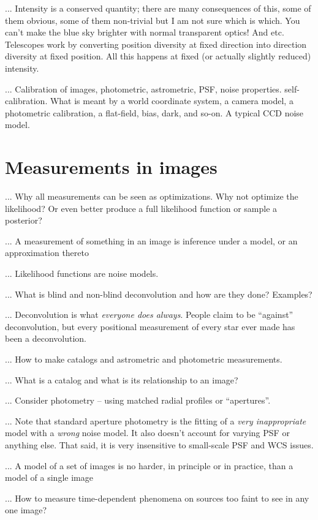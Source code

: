 \documentclass[12pt,twoside,pdftex]{article}
\begin{document}
... Intensity is a conserved quantity; there are many consequences of
this, some of them obvious, some of them non-trivial but I am not sure
which is which.  You can't make the blue sky brighter with normal
transparent optics!  And etc.  Telescopes work by converting position
diversity at fixed direction into direction diversity at fixed
position.  All this happens at fixed (or actually slightly reduced)
intensity.

... Calibration of images, photometric, astrometric, PSF, noise
properties.  self-calibration.  What is meant by a world coordinate
system, a camera model, a photometric calibration, a flat-field, bias,
dark, and so-on.  A typical CCD noise model.

\section{Measurements in images}

... Why all measurements can be seen as optimizations.  Why not
optimize the likelihood?  Or even better produce a full likelihood
function or sample a posterior?

... A measurement of something in an image is inference under a model,
or an approximation thereto

... Likelihood functions are noise models.

... What is blind and non-blind deconvolution and how are they done?
Examples?
 
... Deconvolution is what \emph{everyone does always}.  People claim
to be ``against'' deconvolution, but every positional measurement of
every star ever made has been a deconvolution.

... How to make catalogs and astrometric and photometric measurements.

... What is a catalog and what is its relationship to an image?

... Consider photometry -- using matched radial profiles or
``apertures''.

... Note that standard aperture photometry is the fitting of a
\emph{very inappropriate} model with a \emph{wrong} noise model.  It
also doesn't account for varying PSF or anything else.  That said, it
is very insensitive to small-scale PSF and WCS issues.

... A model of a set of images is no harder, in principle or in
practice, than a model of a single image

... How to measure time-dependent phenomena on sources too faint to
see in any one image?
\end{document}
